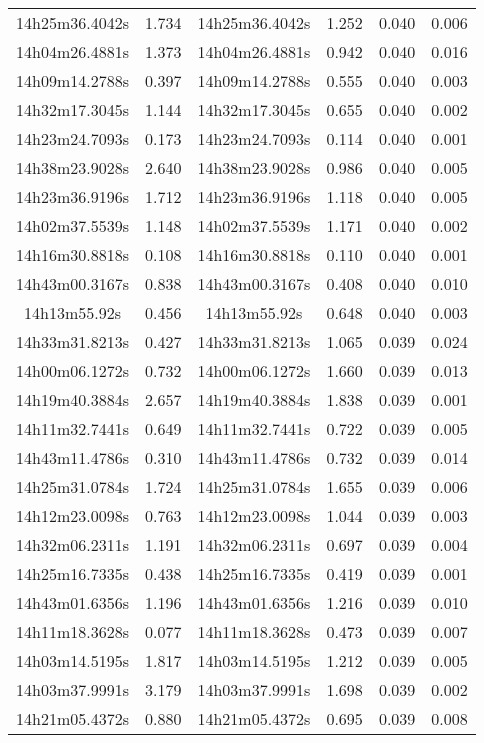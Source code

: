 \begin{table}
\begin{tabular}{cccccc}
14h25m36.4042s & 1.734 & 14h25m36.4042s & 1.252 & 0.040 & 0.006 \\
14h04m26.4881s & 1.373 & 14h04m26.4881s & 0.942 & 0.040 & 0.016 \\
14h09m14.2788s & 0.397 & 14h09m14.2788s & 0.555 & 0.040 & 0.003 \\
14h32m17.3045s & 1.144 & 14h32m17.3045s & 0.655 & 0.040 & 0.002 \\
14h23m24.7093s & 0.173 & 14h23m24.7093s & 0.114 & 0.040 & 0.001 \\
14h38m23.9028s & 2.640 & 14h38m23.9028s & 0.986 & 0.040 & 0.005 \\
14h23m36.9196s & 1.712 & 14h23m36.9196s & 1.118 & 0.040 & 0.005 \\
14h02m37.5539s & 1.148 & 14h02m37.5539s & 1.171 & 0.040 & 0.002 \\
14h16m30.8818s & 0.108 & 14h16m30.8818s & 0.110 & 0.040 & 0.001 \\
14h43m00.3167s & 0.838 & 14h43m00.3167s & 0.408 & 0.040 & 0.010 \\
14h13m55.92s & 0.456 & 14h13m55.92s & 0.648 & 0.040 & 0.003 \\
14h33m31.8213s & 0.427 & 14h33m31.8213s & 1.065 & 0.039 & 0.024 \\
14h00m06.1272s & 0.732 & 14h00m06.1272s & 1.660 & 0.039 & 0.013 \\
14h19m40.3884s & 2.657 & 14h19m40.3884s & 1.838 & 0.039 & 0.001 \\
14h11m32.7441s & 0.649 & 14h11m32.7441s & 0.722 & 0.039 & 0.005 \\
14h43m11.4786s & 0.310 & 14h43m11.4786s & 0.732 & 0.039 & 0.014 \\
14h25m31.0784s & 1.724 & 14h25m31.0784s & 1.655 & 0.039 & 0.006 \\
14h12m23.0098s & 0.763 & 14h12m23.0098s & 1.044 & 0.039 & 0.003 \\
14h32m06.2311s & 1.191 & 14h32m06.2311s & 0.697 & 0.039 & 0.004 \\
14h25m16.7335s & 0.438 & 14h25m16.7335s & 0.419 & 0.039 & 0.001 \\
14h43m01.6356s & 1.196 & 14h43m01.6356s & 1.216 & 0.039 & 0.010 \\
14h11m18.3628s & 0.077 & 14h11m18.3628s & 0.473 & 0.039 & 0.007 \\
14h03m14.5195s & 1.817 & 14h03m14.5195s & 1.212 & 0.039 & 0.005 \\
14h03m37.9991s & 3.179 & 14h03m37.9991s & 1.698 & 0.039 & 0.002 \\
14h21m05.4372s & 0.880 & 14h21m05.4372s & 0.695 & 0.039 & 0.008 \\

\end{tabular}
\end{table}
